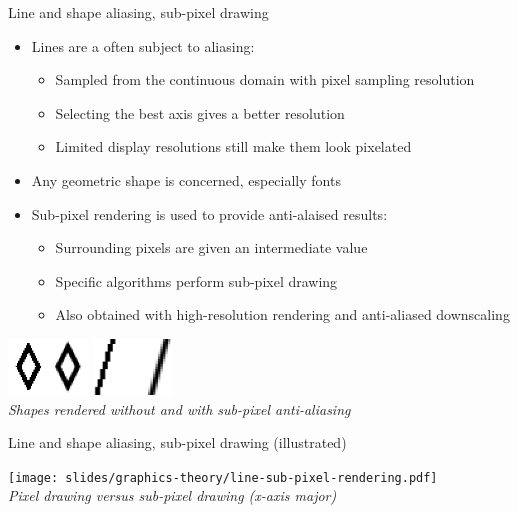 \begin{frame}{Line and shape aliasing, sub-pixel drawing}
  \begin{itemize}
  \item Lines are a often subject to aliasing:
    \begin{itemize}
    \item Sampled from the continuous domain with pixel sampling resolution
    \item Selecting the best axis gives a better resolution
    \item Limited display resolutions still make them look pixelated
    \end{itemize}
  \item Any geometric shape is concerned, especially fonts
  \item Sub-pixel rendering is used to provide anti-alaised results:
    \begin{itemize}
    \item Surrounding pixels are given an intermediate value
    \item Specific algorithms perform sub-pixel drawing
    \item Also obtained with high-resolution rendering and anti-aliased downscaling
    \end{itemize}
  \end{itemize}

  \begin{center}
  \includegraphics[height=4em]{slides/graphics-theory/diamond-sub-pixel.png}
  \includegraphics[height=4em]{slides/graphics-theory/line-sub-pixel.png}\\
  \textit{\small Shapes rendered without and with sub-pixel anti-aliasing}
  \end{center}
\end{frame}

\begin{frame}{Line and shape aliasing, sub-pixel drawing (illustrated)}
  \begin{center}
  \texttt{[image: slides/graphics-theory/line-sub-pixel-rendering.pdf]}\\
  \textit{\small Pixel drawing versus sub-pixel drawing (x-axis major)}
  \end{center}
\end{frame}

